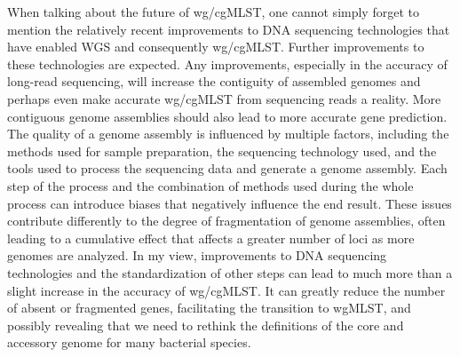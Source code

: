 When talking about the future of \ac{wg/cgMLST}, one cannot simply forget to mention the relatively recent improvements to \ac{DNA} sequencing technologies that have enabled \ac{WGS} and consequently \ac{wg/cgMLST}. Further improvements to these technologies are expected. Any improvements, especially in the accuracy of long-read sequencing, will increase the contiguity of assembled genomes and perhaps even make accurate \ac{wg/cgMLST} from sequencing reads a reality. More contiguous genome assemblies should also lead to more accurate gene prediction. The quality of a genome assembly is influenced by multiple factors, including the methods used for sample preparation, the sequencing technology used, and the tools used to process the sequencing data and generate a genome assembly. Each step of the process and the combination of methods used during the whole process can introduce biases that negatively influence the end result. These issues contribute differently to the degree of fragmentation of genome assemblies, often leading to a cumulative effect that affects a greater number of loci as more genomes are analyzed. In my view, improvements to \ac{DNA} sequencing technologies and the standardization of other steps can lead to much more than a slight increase in the accuracy of \ac{wg/cgMLST}. It can greatly reduce the number of absent or fragmented genes, facilitating the transition to \ac{wgMLST}, and possibly revealing that we need to rethink the definitions of the core and accessory genome for many bacterial species.

